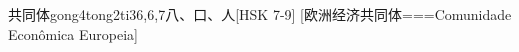 \begin{EntryWithPhonetic}{共同体}{gong4tong2ti3}{6,6,7}{⼋、⼝、⼈}[HSK 7-9]
  [欧洲经济共同体===Comunidade Econômica Europeia]
\end{EntryWithPhonetic}
